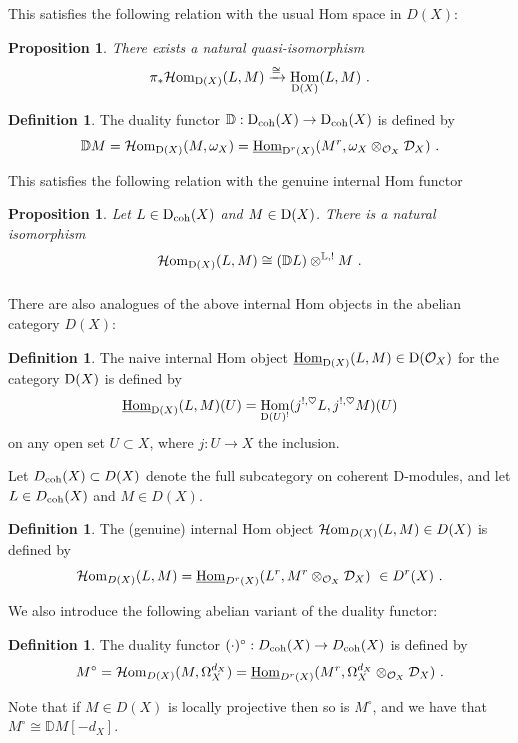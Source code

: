 \documentclass[11pt]{amsart}
\numberwithin{equation}{section}
\newtheorem{prop}[theo]{Proposition}
\theoremstyle{definition}
\newtheorem{defn}[theo]{Definition}
\newcommand{\bb}{\mathbb}
\newcommand{\mc}{\mathcal}
\newcommand{\DDD}{{{\bb D}}}
\DeclareMathOperator{\Hom}{Hom}
\newcommand{\Homi}{{\mc H\textup{om}}}
\newcommand{\coh}{{\textup{coh}}}
\newcommand{\0}{{\textbf{0}}}
\newcommand{\Dd}{{\textup{D}}}
\newcommand{\DD}{{D}}
\newcommand{\Homii}{{\underline{\textup{Hom}}}}
\begin{document}
This satisfies the following relation with the usual Hom space in $\DD(X)$:
\begin{prop}\label{inthommatchprop} There exists a natural quasi-isomorphism
	\[\pi_* \Homi_{\Dd(X)}(L,M) \xrightarrow{\cong}\Hom_{\Dd(X)}(L,M) \  .  \]
\end{prop}

\begin{defn} The duality functor $\DDD:\Dd_\coh(X) \to \Dd_\coh(X)$ is defined by
	\[ \DDD M = \Homi_{\Dd(X)}(M, \omega_X) = \Homii_{\Dd^r(X)}( M^r,\omega_X\otimes_{\mc O_X}\mc D_X) \ . \]
\end{defn}

This satisfies the following relation with the genuine internal Hom functor
\begin{prop}\label{inthomdescprop} Let $L\in \Dd_\coh(X)$ and $M\in \Dd(X)$. There is a natural isomorphism
	\[\Homi_{\Dd(X)}(L,M)  \cong (\DDD L) \otimes^{\bb L,!} M \ . \]
\end{prop}





\subsubsection{} There are also analogues of the above internal Hom objects in the abelian category $\DD(X)$:

\begin{defn}
	The naive internal Hom object $ \Homii_{\Dd(X)}(L,M) \in\Dd(\mc O_X)$ for the category $\Dd(X)$ is defined by
	\[  \Homii_{\Dd(X)}(L,M)(U) = \Hom_{\Dd(U)^!}(j^{!,\heartsuit}L,j^{!,\heartsuit}M)(U) \]
	on any open set $U\subset X$, where $j:U\to X$ the inclusion.
\end{defn}

Let $\DD_\coh(X) \subset \DD(X)$ denote the full subcategory on coherent D-modules, and let $L\in \DD_\coh(X)$ and $M\in \DD(X)$.

\begin{defn}  The (genuine) internal Hom object $\Homi_{\DD(X)}(L,M) \in \DD(X)$ is defined by 
	\[\Homi_{\DD(X)}(L,M)  = \Homii_{\DD^r(X)}(L^r, M^r \otimes_{\mc O_X} \mc D_X )  \ \in \DD^r(X) \ . \]
\end{defn}

We also introduce the following abelian variant of the duality functor:

\begin{defn} The duality functor $(\cdot)^{\circ}:\DD_\coh(X) \to \DD_\coh(X)$ is defined by
	\[ M^{\circ} = \Homi_{\DD(X)}(M, \Omega^{d_X}_X) = \Homii_{\DD^r(X)}( M^r,\Omega^{d_X}_X\otimes_{\mc O_X}\mc D_X) \ . \]
\end{defn}
Note that if $M\in \DD(X)$ is locally projective then so is $M^\circ$, and we have that $M^\circ \cong \DDD M[-d_X]$.
\end{document}
